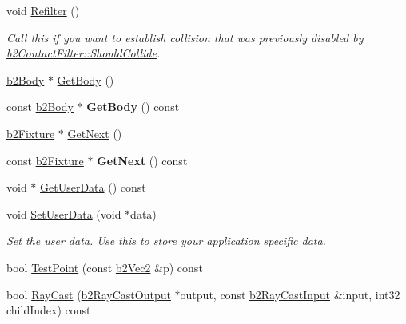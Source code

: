 \begin{DoxyCompactItemize}
\mbox{\label{classb2Fixture_a45d3320f94811d67383c48466165fa26}} 
void \mbox{\hyperlink{classb2Fixture_a45d3320f94811d67383c48466165fa26}{Refilter}} ()
\begin{DoxyCompactList}\small\item\em Call this if you want to establish collision that was previously disabled by \mbox{\hyperlink{classb2ContactFilter_aac8f6155d1f577d125db587f5269289b}{b2\+Contact\+Filter\+::\+Should\+Collide}}. \end{DoxyCompactList}\item 
\mbox{\hyperlink{classb2Body}{b2\+Body}} $\ast$ \mbox{\hyperlink{classb2Fixture_a9d6536ef274d768e86ab0a8330921535}{Get\+Body}} ()
\item 
\mbox{\label{classb2Fixture_ae9cabf82e360f92e8fcb36b1923ab991}} 
const \mbox{\hyperlink{classb2Body}{b2\+Body}} $\ast$ {\bfseries Get\+Body} () const
\item 
\mbox{\hyperlink{classb2Fixture}{b2\+Fixture}} $\ast$ \mbox{\hyperlink{classb2Fixture_a0241952461f6f1a04a3c850306390fd2}{Get\+Next}} ()
\item 
\mbox{\label{classb2Fixture_a6b474fa22b49de3dbe446a67f021beb2}} 
const \mbox{\hyperlink{classb2Fixture}{b2\+Fixture}} $\ast$ {\bfseries Get\+Next} () const
\item 
void $\ast$ \mbox{\hyperlink{classb2Fixture_ae2a865ed59ffe9b1cb89f577052f4d50}{Get\+User\+Data}} () const
\item 
\mbox{\label{classb2Fixture_a3db7f89ef4493247d922fe3d96351ad9}} 
void \mbox{\hyperlink{classb2Fixture_a3db7f89ef4493247d922fe3d96351ad9}{Set\+User\+Data}} (void $\ast$data)
\begin{DoxyCompactList}\small\item\em Set the user data. Use this to store your application specific data. \end{DoxyCompactList}\item 
bool \mbox{\hyperlink{classb2Fixture_aa56d3ca04a5d0478c6477876cd480cc6}{Test\+Point}} (const \mbox{\hyperlink{structb2Vec2}{b2\+Vec2}} \&p) const
\item 
bool \mbox{\hyperlink{classb2Fixture_aaaafd69aa3e1a922acc4b9d7fb49170a}{Ray\+Cast}} (\mbox{\hyperlink{structb2RayCastOutput}{b2\+Ray\+Cast\+Output}} $\ast$output, const \mbox{\hyperlink{structb2RayCastInput}{b2\+Ray\+Cast\+Input}} \&input, int32 child\+Index) const

\end{DoxyCompactItemize}

